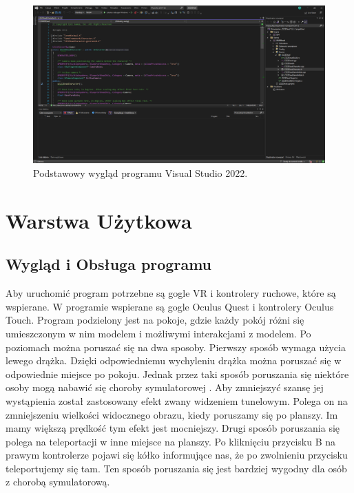\documentclass[a4paper,12pt,reqno]{article}
\begin{document}
\begin{figure}[!ht]%
\centering
\includegraphics[width=1\columnwidth]{graphics/VSView.png}
\caption{Podstawowy wygląd programu Visual Studio 2022.
\label{OpenBrush}}%
%
\qquad
\end{figure}  

\newpage
\section{Warstwa Użytkowa}

\subsection{Wygląd i Obsługa programu}

Aby uruchomić program potrzebne są gogle VR i kontrolery ruchowe, które są wspierane. W programie wspierane są gogle Oculus Quest i kontrolery Oculus Touch. Program podzielony jest na pokoje, gdzie każdy pokój różni się umieszczonym w nim modelem i możliwymi interakcjami z modelem. Po poziomach można poruszać się na dwa sposoby. Pierwszy sposób wymaga użycia lewego drążka. Dzięki odpowiedniemu wychyleniu drążka można poruszać się w odpowiednie miejsce po pokoju. Jednak przez taki sposób poruszania się niektóre osoby mogą nabawić się choroby symulatorowej \cite{choroba_vr}. Aby zmniejszyć szansę jej wystąpienia został zastosowany efekt zwany widzeniem tunelowym. Polega on na zmniejszeniu wielkości widocznego obrazu, kiedy poruszamy się po planszy. Im mamy większą prędkość tym efekt jest mocniejszy. Drugi sposób poruszania się polega na teleportacji w inne miejsce na planszy. Po kliknięciu przycisku B na prawym kontrolerze pojawi się kółko informujące nas, że po zwolnieniu przycisku teleportujemy się tam. Ten sposób poruszania się jest bardziej wygodny dla osób z chorobą symulatorową.
\end{document}
